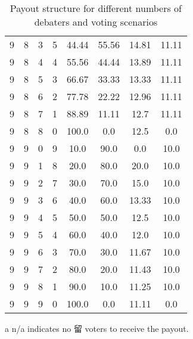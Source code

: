 \documentclass[9pt]{article}
\begin{document}
\begin{table}[h]
\begin{threeparttable}
\begin{tabular}{cccccccc}
9 & 8 & 3 & 5 & 44.44 & 55.56 & 14.81 & 11.11 \\
9 & 8 & 4 & 4 & 55.56 & 44.44 & 13.89 & 11.11 \\
9 & 8 & 5 & 3 & 66.67 & 33.33 & 13.33 & 11.11 \\
9 & 8 & 6 & 2 & 77.78 & 22.22 & 12.96 & 11.11 \\
9 & 8 & 7 & 1 & 88.89 & 11.11 & 12.7 & 11.11 \\
9 & 8 & 8 & 0 & 100.0 & 0.0 & 12.5 & 0.0 \\
9 & 9 & 0 & 9 & 10.0 & 90.0 & 0.0 & 10.0 \\
9 & 9 & 1 & 8 & 20.0 & 80.0 & 20.0 & 10.0 \\
9 & 9 & 2 & 7 & 30.0 & 70.0 & 15.0 & 10.0 \\
9 & 9 & 3 & 6 & 40.0 & 60.0 & 13.33 & 10.0 \\
9 & 9 & 4 & 5 & 50.0 & 50.0 & 12.5 & 10.0 \\
9 & 9 & 5 & 4 & 60.0 & 40.0 & 12.0 & 10.0 \\
9 & 9 & 6 & 3 & 70.0 & 30.0 & 11.67 & 10.0 \\
9 & 9 & 7 & 2 & 80.0 & 20.0 & 11.43 & 10.0 \\
9 & 9 & 8 & 1 & 90.0 & 10.0 & 11.25 & 10.0 \\
9 & 9 & 9 & 0 & 100.0 & 0.0 & 11.11 & 0.0 \\
\bottomrule
\end{tabular}
\begin{tablenotes}
    \item[a] n/a indicates no 留 voters to receive the payout.
\end{tablenotes}
\caption{Payout structure for different numbers of debaters and voting scenarios}
\end{threeparttable}
\end{table}
\end{document}
